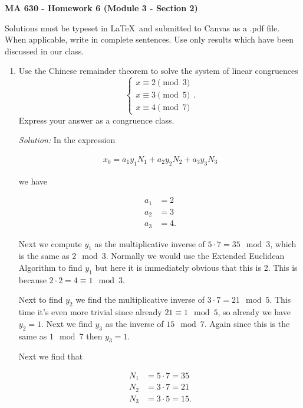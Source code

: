 \documentclass[12pt]{article}
\begin{document}
\pagestyle{empty}

 {\noindent \textbf{\large MA 630 - Homework 6 (Module 3 - Section 2)}
\vspace{.25in}

\noindent Solutions must be typeset in \LaTeX \ and submitted to Canvas as a .pdf file. When applicable, write in complete sentences. Use only results which have been discussed in our class.
\vspace{.25in}

\begin{enumerate}
\item Use the Chinese remainder theorem to solve the system of linear congruences
\[\begin{cases}
x \equiv 2 \pmod{3}\\
x \equiv 3 \pmod{5}\\
x \equiv 4 \pmod{7}
\end{cases}.\]
Express your answer as a congruence class.

\vspace{1cm}

{\it Solution: } In the expression

\begin{align*}
  x_0 = a_1y_1N_1 + a_2y_2N_2 + a_3y_3N_3
\end{align*}

we have

\begin{align*}
  a_1 &= 2\\
  a_2 &= 3\\
  a_3 &= 4.
\end{align*}

Next we compute $y_1$ as the multiplicative inverse of $5\cdot 7=35\mod 3$, which is the same as $2\mod 3$.  Normally we would use the Extended Euclidean Algorithm to find $y_1$ but here it is immediately obvious that this is 2.  This is because $2\cdot 2 = 4\equiv 1\mod 3$.

Next to find $y_2$ we find the multiplicative inverse of $3\cdot 7 = 21 \mod 5$.  This time it's even more trivial since already $21\equiv 1\mod 5$, so already we have $y_2=1$. Next we find $y_3$ as the inverse of $15 \mod 7$.  Again since this is the same as $1\mod 7$ then $y_3=1$.

Next we find that

\begin{align*}
  N_1 &= 5\cdot 7 = 35 \\
  N_2 &= 3\cdot 7 = 21 \\
  N_3 &= 3\cdot 5 = 15.
\end{align*}


\end{enumerate}}
\end{document}
